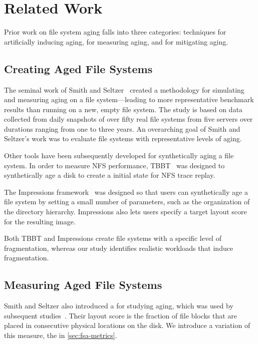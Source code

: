 \section{Related Work}\label{sec:fsa-related}
Prior work on file system aging falls into three categories:
techniques for artificially inducing aging, for
measuring aging, and for mitigating aging.

\subsection{Creating Aged File Systems}

The seminal work of Smith and Seltzer~\cite{DBLP:conf/sigmetrics/SmithS97}
created a methodology for simulating and measuring aging on a file
system---leading to more representative benchmark results than running on a
new, empty file system.  The study is based on data  collected from daily
snapshots of over fifty real file systems from five servers over durations
ranging from one to three years.  An overarching goal of Smith and Seltzer's
work was to evaluate file systems with representative levels of aging.

Other tools have been subsequently developed for synthetically aging a file
system.  In order to measure NFS performance,
TBBT~\cite{DBLP:conf/fast/ZhuCC05} was designed to synthetically age a disk to
create a initial state for NFS trace replay.

The Impressions framework~\cite{DBLP:journals/tos/AgrawalAA09} was designed so
that users can synthetically age a file system by setting a small number of
parameters, such as the organization of the directory hierarchy.  Impressions
also lets users specify a target layout score for the resulting image.

Both TBBT and Impressions create file systems with a specific level of
fragmentation, whereas our study identifies realistic workloads that induce
fragmentation. 

\subsection{Measuring Aged File Systems}

Smith and Seltzer also introduced a  for studying aging,
which was used by subsequent
studies~\cite{DBLP:conf/mascots/AhnKCP02,DBLP:journals/tos/AgrawalAA09}. Their
layout score is the fraction of file blocks that are placed in consecutive
physical locations on the disk. We introduce a variation of this measure, the
 in \cref{sec:fsa-metrics}.

